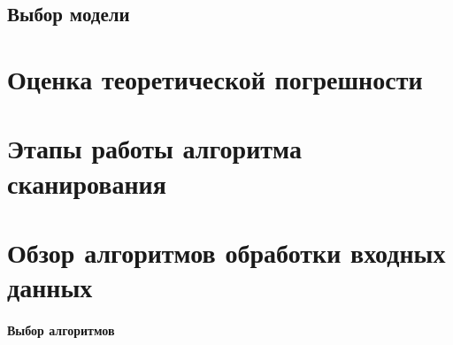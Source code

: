         \subsection{Выбор модели}

    \section{Оценка теоретической погрешности}
    
    \section{Этапы работы алгоритма сканирования}
    
    \section{Обзор алгоритмов обработки входных данных}
        \paragraph{Выбор алгоритмов}